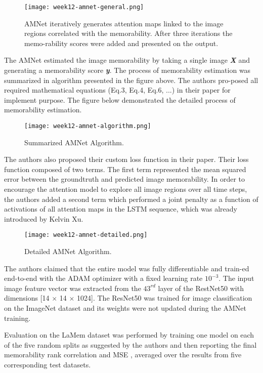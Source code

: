 \begin{figure}[!ht]
\centering
\texttt{[image: week12-amnet-general.png]}
\caption{AMNet iteratively generates attention maps linked to the image regions correlated with the memorability. After three iterations the memo-rability scores were added and presented on the output.}
\end{figure}

The AMNet estimated the image memorability by taking a single image \textbf{\emph{X}} and generating a memorability score \textbf{\emph{y}}. The process of memorability estimation was summarized in algorithm presented in the figure above. The authors pro-posed all required mathematical equations (Eq.3, Eq.4, Eq.6, ...) in their paper for implement purpose. The figure below demonstrated the detailed process of memorability estimation.

\newpage
\begin{figure}[!ht]
\centering
\texttt{[image: week12-amnet-algorithm.png]}
\caption{Summarized AMNet Algorithm.}
\end{figure}

The authors also proposed their custom loss function in their paper. Their loss function composed of two terms. The first term represented the mean squared error between the groundtruth and predicted image memorability. In order to encourage the attention model to explore all image regions over all time steps, the authors added a second term which performed a joint penalty as a function of activations of all attention maps in the LSTM sequence, which was already introduced by Kelvin Xu\cite{visualatt}.

\begin{figure}[!ht]
\centering
\texttt{[image: week12-amnet-detailed.png]}
\caption{Detailed AMNet Algorithm.}
\end{figure}

The authors claimed that the entire model was fully differentiable and train-ed end-to-end with the ADAM\cite{adam} optimizer with a fixed learning rate $10^{−3}$. The input image feature vector was extracted from the $43^{rd}$ layer of the RestNet50 with dimensions [14 $\times$ 14 $\times$ 1024]. The ResNet50 was trained for image classification on the ImageNet dataset and its weights were not updated during the AMNet training.

Evaluation on the LaMem dataset was performed by training one model on each of the five random splits as suggested by the authors and then reporting the final memorability rank correlation and MSE , averaged over the results from five corresponding test datasets.

